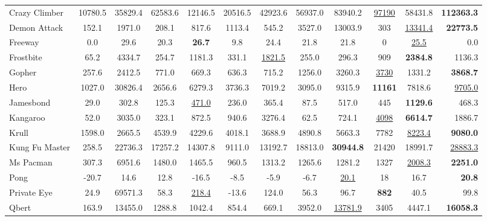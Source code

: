 \begin{table*}[ht]
\begin{center}
\begin{small}
{\begin{tabular}{lccccccccccr}
Crazy Climber       &  10780.5 &  35829.4 &  62583.6 & 12146.5 &  20516.5 & 42923.6 & 56937.0 & 83940.2 & \underline{97190} & 58431.8 & \textbf{112363.3} \\
Demon Attack        &    152.1 &   1971.0 &    208.1 &   817.6 &    1113.4&   545.2 & 3527.0 & 13003.9 & 303 & \underline{13341.4} & \textbf{22773.5} \\
Freeway             &      0.0 &     29.6 &     20.3 &    \textbf{26.7} &      9.8 &    24.4 & 21.8 & 21.8 & 0 & \underline{25.5} & 0.0 \\
Frostbite           &     65.2 &   4334.7 &    254.7 &  1181.3 &    331.1 &  \underline{1821.5} & 255.0 & 296.3 & 909 & \textbf{2384.8} & 1136.3 \\
Gopher              &    257.6 &   2412.5 &    771.0 &   669.3 &    636.3 &   715.2 & 1256.0 & 3260.3 & \underline{3730} & 1331.2 & \textbf{3868.7} \\
Hero                &   1027.0 &  30826.4 &   2656.6 &  6279.3 &   3736.3 &  7019.2 & 3095.0 & 9315.9 & \textbf{11161} & 7818.6 & \underline{9705.0} \\
Jamesbond           &     29.0 &    302.8 &    125.3 &   \underline{471.0} &    236.0 &   365.4 & 87.5 & 517.0 & 445 & \textbf{1129.6} & 468.3 \\
Kangaroo            &     52.0 &   3035.0 &    323.1 &   872.5 &    940.6 &  3276.4 & 62.5 & 724.1 & \underline{4098} & \textbf{6614.7} & 1886.7 \\
Krull               &   1598.0 &   2665.5 &   4539.9 &  4229.6 &   4018.1 &  3688.9 & 4890.8 & 5663.3 & 7782 & \underline{8223.4} & \textbf{9080.0}\\
Kung Fu Master      &    258.5 &  22736.3 &  17257.2 &  14307.8 &   9111.0 & 13192.7 & 18813.0 & \textbf{30944.8} & 21420 & 18991.7 & \underline{28883.3} \\
Ms Pacman           &    307.3 &   6951.6 &   1480.0 &   1465.5 &    960.5 &  1313.2 & 1265.6 & 1281.2 & 1327 & \underline{2008.3} & \textbf{2251.0} \\
Pong                &    -20.7 &     14.6 &     12.8 &     -16.5 &     -8.5 &    -5.9 & -6.7 & \underline{20.1} & 18 & 16.7 & \textbf{20.8} \\
Private Eye         &     24.9 &  69571.3 &     58.3 &   \underline{218.4} &    -13.6 &   124.0 & 56.3 & 96.7 & \textbf{882} & 40.5 & 99.8 \\
Qbert               &    163.9 &  13455.0 &   1288.8 &   1042.4 &    854.4 &   669.1 & 3952.0 & \underline{13781.9} & 3405 & 4447.1 & \textbf{16058.3} \\

\end{tabular}}
\end{small}
\end{center}
\end{table*}

